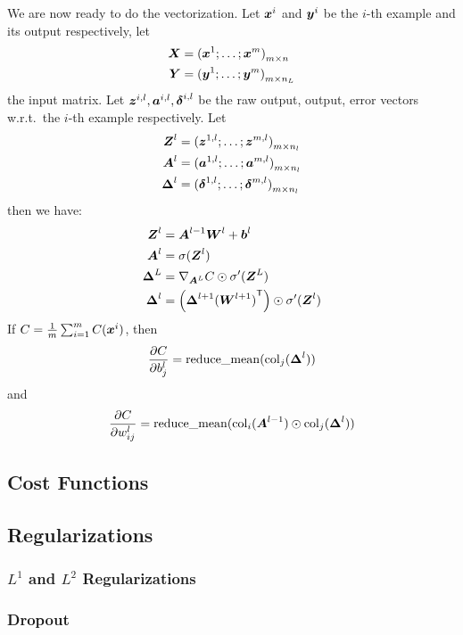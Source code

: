 We are now ready to do the vectorization. Let $\boldsymbol{x}^i$ and $\boldsymbol{y}^i$
be the $i$-th example and its output respectively, let
\begin{align*}
    \boldsymbol{X} &= {(\boldsymbol{x}^1; \ldots; \boldsymbol{x}^m)}_{m \times n}\\
    \boldsymbol{Y} &= {(\boldsymbol{y}^1; \ldots; \boldsymbol{y}^m)}_{m \times n_L}
\end{align*}
the input matrix. 
Let $\boldsymbol{z}^{i, l}, \boldsymbol{a}^{i, l}, \boldsymbol{\delta}^{i, l}$ be the raw output, output, error vectors w.r.t.\ the
$i$-th example respectively. Let 
\begin{align*}
    \boldsymbol{Z}^l &= {(\boldsymbol{z}^{1, l}; \ldots; \boldsymbol{z}^{m, l})}_{m \times n_l}\\
    \boldsymbol{A}^l &= {(\boldsymbol{a}^{1, l}; \ldots; \boldsymbol{a}^{m, l})}_{m \times n_l}\\
    \boldsymbol{\Delta}^l &= {(\boldsymbol{\delta}^{1, l}; \ldots; \boldsymbol{\delta}^{m, l})}_{m \times n_l}
\end{align*}
then we have:
\begin{align}
    \boldsymbol{Z}^l &= \boldsymbol{A}^{l-1} \boldsymbol{W}^l + \boldsymbol{b}^l\\
    \boldsymbol{A}^l &= \sigma(\boldsymbol{Z}^l)\\
    \boldsymbol{\Delta}^L &= \nabla_{\boldsymbol{A}^L}C \odot \sigma'(\boldsymbol{Z}^L)\\
    \boldsymbol{\Delta}^l &= \left(\boldsymbol{\Delta}^{l+1} {(\boldsymbol{W}^{l+1})}^\mathsf{T}\right) \odot \sigma'(\boldsymbol{Z}^l)
\end{align}
If $C = \frac{1}{m}\sum_{i=1}^m C(\boldsymbol{x}^i)$, then
$$\frac{\partial {C}}{\partial {b^l_j}} = \operatorname{reduce\_mean}(\operatorname{col}_j(\boldsymbol{\Delta}^l))$$
and
$$\frac{\partial {C}}{\partial {w^l_{ij}}} = \operatorname{reduce\_mean}(\operatorname{col}_i(\boldsymbol{A}^{l-1}) \odot 
\operatorname{col}_j (\boldsymbol{\Delta}^l))$$

\subsection{Cost Functions}


\subsection{Regularizations}
\subsubsection{$L^1$ and $L^2$ Regularizations}

\subsubsection{Dropout}
